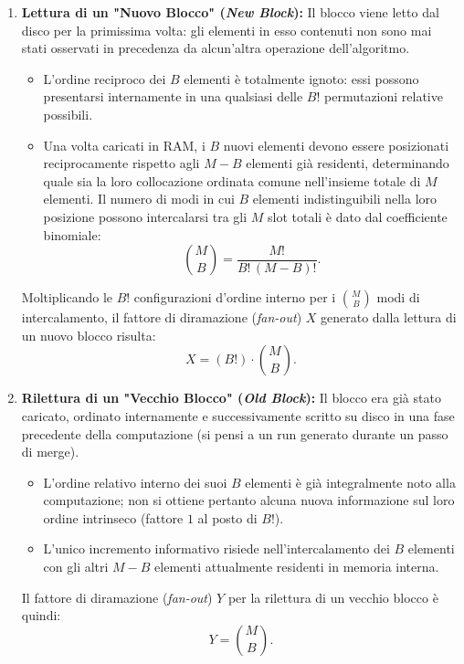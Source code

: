 \begin{enumerate}
  \item \textbf{Lettura di un "Nuovo Blocco" (\textit{New Block}):}
  Il blocco viene letto dal disco per la primissima volta: gli elementi in esso contenuti non sono mai stati osservati in precedenza da alcun'altra operazione dell'algoritmo.
  \begin{itemize}
    \item L'ordine reciproco dei $B$ elementi è totalmente ignoto: essi possono presentarsi internamente in una qualsiasi delle $B!$ permutazioni relative possibili.
    \item Una volta caricati in RAM, i $B$ nuovi elementi devono essere posizionati reciprocamente rispetto agli $M - B$ elementi già residenti, determinando quale sia la loro collocazione ordinata comune nell'insieme totale di $M$ elementi. Il numero di modi in cui $B$ elementi indistinguibili nella loro posizione possono intercalarsi tra gli $M$ slot totali è dato dal coefficiente binomiale:
    \begin{equation}
      \binom{M}{B} = \frac{M!}{B! \, (M - B)!}.
    \end{equation}
  \end{itemize}
  Moltiplicando le $B!$ configurazioni d'ordine interno per i $\binom{M}{B}$ modi di intercalamento, il fattore di diramazione (\textit{fan-out}) $X$ generato dalla lettura di un nuovo blocco risulta:
  \begin{equation}
    X = (B!) \cdot \binom{M}{B}.
    \label{eq:fanout-new-block}
  \end{equation}

  \item \textbf{Rilettura di un "Vecchio Blocco" (\textit{Old Block}):}
  Il blocco era già stato caricato, ordinato internamente e successivamente scritto su disco in una fase precedente della computazione (si pensi a un run generato durante un passo di merge).
  \begin{itemize}
    \item L'ordine relativo interno dei suoi $B$ elementi è già integralmente noto alla computazione; non si ottiene pertanto alcuna nuova informazione sul loro ordine intrinseco (fattore $1$ al posto di $B!$).
    \item L'unico incremento informativo risiede nell'intercalamento dei $B$ elementi con gli altri $M - B$ elementi attualmente residenti in memoria interna.
  \end{itemize}
  Il fattore di diramazione (\textit{fan-out}) $Y$ per la rilettura di un vecchio blocco è quindi:
  \begin{equation}
    Y = \binom{M}{B}.
    \label{eq:fanout-old-block}
  \end{equation}
\end{enumerate}


